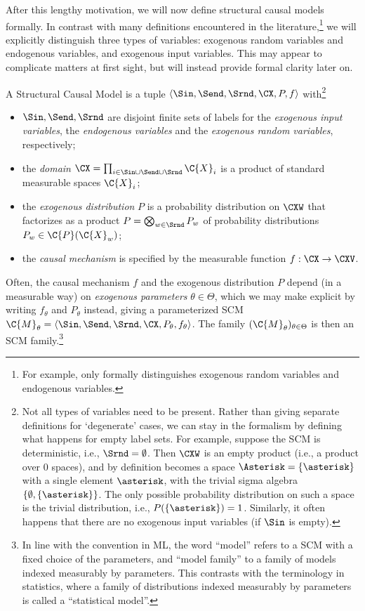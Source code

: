 After this lengthy motivation, we will now define structural causal models formally.
In contrast with many definitions encountered in the literature,\footnote{For
example, \cite{Pearl09} only formally distinguishes exogenous random variables and 
endogenous variables.} we will explicitly distinguish
three types of variables: exogenous random variables and endogenous variables, and exogenous
input variables. This may appear to complicate matters at first sight, but will instead provide 
formal clarity later on.
\begin{Def}\label{def:scm}
  A Structural Causal Model is a tuple $\langle \Sin, \Send, \Srnd, \CX, P, f \rangle$ 
  with\footnote{Not all types of variables need to be present. Rather than giving separate definitions for `degenerate' cases, we can stay in the formalism by defining what happens for empty label sets. For example, suppose the SCM is deterministic, i.e., $\Srnd = \emptyset$. Then $\CXW$ is an empty product (i.e., a product over 0 spaces), and by definition becomes a space $\Asterisk = \{\asterisk\}$ with a single element $\asterisk$, with the trivial sigma algebra $\{\emptyset,\{\asterisk\}\}$. The only possible probability distribution on such a space is the trivial distribution, i.e., $P(\{\asterisk\}) = 1$. Similarly, it often happens that there are no exogenous input variables (if $\Sin$ is empty).}
  \begin{itemize}
    \item $\Sin, \Send, \Srnd$ are disjoint finite sets of labels for the \emph{exogenous input variables}, the \emph{endogenous variables} and the \emph{exogenous random variables}, respectively;
    \item the \emph{domain} $\CX = \prod_{i\in \Sin \cup \Send \cup \Srnd} \C{X}_i$ is a product of standard measurable spaces $\C{X}_i$;
    \item the \emph{exogenous distribution} $P$ is a probability distribution on $\CXW$ that factorizes as a product $P = \bigotimes_{w\in\Srnd} P_w$ of probability distributions $P_w \in \C{P}(\C{X}_w)$;
    \item the \emph{causal mechanism} is specified by the measurable function $f : \CX \to \CXV$.
  \end{itemize}
Often, the causal mechanism $f$ and the exogenous distribution $P$ depend (in a measurable way) on 
\emph{exogenous parameters} $\theta\in\Theta$, which we may make explicit by writing
$f_{\theta}$ and $P_{\theta}$ instead, giving a parameterized SCM
$\C{M}_{\theta} = \langle \Sin, \Send, \Srnd, \CX, P_{\theta}, f_{\theta} \rangle$.
The family $(\C{M}_{\theta})_{\theta \in \Theta}$ is then an SCM family.\footnote{In line with the convention in ML, the word ``model'' refers to a SCM with a fixed choice of the parameters, and ``model family'' to a family of models
indexed measurably by parameters. This contrasts with the terminology in statistics, where a family
of distributions indexed measurably by parameters is called a ``statistical model''.} 
\end{Def}

